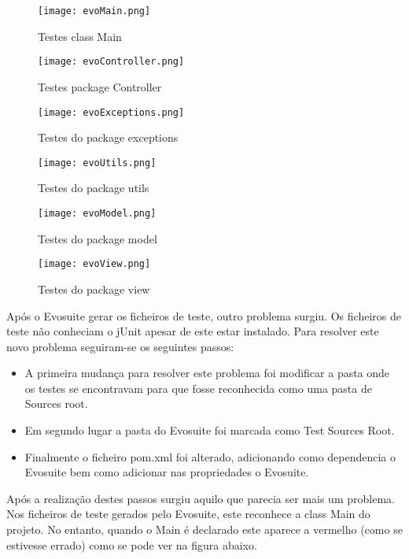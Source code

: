 \begin{figure}[H]

  \centering

  \texttt{[image: evoMain.png]}

  \caption {Testes class Main}

  \texttt{[image: evoController.png]}

  \caption {Testes package Controller}

  \texttt{[image: evoExceptions.png]}

  \caption {Testes do package exceptions}

  \texttt{[image: evoUtils.png]}

  \caption {Testes do package utils}
  \label {fig35}

\end{figure}  
\begin{figure}[H]

  \centering
  \texttt{[image: evoModel.png]}

  \caption {Testes do package model}

  \texttt{[image: evoView.png]}

  \caption {Testes do package view}

  \label {fig36}

\end{figure}

\par Após o Evosuite gerar os ficheiros de teste, outro problema surgiu. Os ficheiros de teste não conheciam o jUnit apesar de este estar instalado. Para resolver este novo problema seguiram-se os seguintes passos:
\begin{itemize}
\item A primeira mudança para resolver este problema foi modificar a pasta onde os testes se encontravam para que fosse reconhecida como uma pasta de Sources root.
\item Em segundo lugar a pasta do Evosuite foi marcada como Test Sources Root.
\item Finalmente o ficheiro pom.xml foi alterado, adicionando como dependencia o Evosuite bem como adicionar nas propriedades o Evosuite.
\end{itemize}

\par Após a realização destes passos surgiu aquilo que parecia ser mais um problema. Nos ficheiros de teste gerados pelo Evosuite, este reconhece a class Main do projeto. No entanto, quando o Main é declarado este aparece a vermelho (como se estivesse errado) como se pode ver na figura abaixo.


